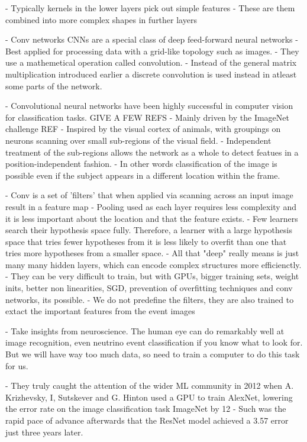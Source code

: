 - Typically kernels in the lower layers pick out simple features
- These are them combined into more complex shapes in further layers

- Conv networks CNNs are a special class of deep feed-forward neural networks
- Best applied for processing data with a grid-like topology such as images.
- They use a mathemetical operation called convolution.
- Instead of the general matrix multiplication introduced earlier a discrete convolution is used
instead in atleast some parts of the network.

- Convolutional neural networks have been highly successful in computer vision for classification
tasks. GIVE A FEW REFS
- Mainly driven by the ImageNet challenge REF
- Inspired by the visual cortex of animals, with groupings on neurons scanning over small
sub-regions of the visual field.
- Independent treatment of the sub-regions allows the network as a whole to detect featues in a
position-independent fashion.
- In other words classification of the image is possible even if the subject appears in a
different location within the frame.

- Conv is a set of 'filters' that when applied via scanning across an input image result in a
feature map
- Pooling used as each layer requires less complexity and it is less important about the location
and that the feature exists.
- Few learners search their hypothesis space fully. Therefore, a learner with a large hypothesis
space that tries fewer hypotheses from it is less likely to overfit than one that tries more
hypotheses from a smaller space.
- All that "deep" really means is just many many hidden layers, which can encode complex
structures more efficienctly.
- They can be very difficult to train, but with GPUs, bigger training sets, weight inits, better
non linearities, SGD, prevention of overfitting techniques and conv networks, its possible.
- We do not predefine the filters, they are also trained to extact the important features from the
event images

- Take insights from neuroscience. The human eye can do remarkably well at image recognition, even
neutrino event classification if you know what to look for. But we will have way too much data, so
need to train a computer to do this task for us.


- They truly caught the attention of the wider ML community in 2012 when A. Krizhevsky, I,
Sutskever and G. Hinton used a GPU to train AlexNet, lowering the error rate on the image
classification task ImageNet by 12%
- Such was the rapid pace of advance afterwards that the ResNet model achieved a 3.57\percent
error just three years later.

